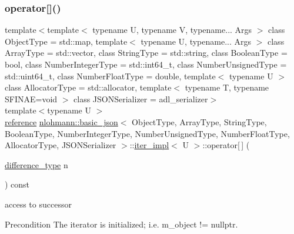 \subsubsection{\texorpdfstring{operator[]()}{operator[]()}}
{\footnotesize\ttfamily template$<$template$<$ typename U, typename V, typename... Args $>$ class Object\+Type = std\+::map, template$<$ typename U, typename... Args $>$ class Array\+Type = std\+::vector, class String\+Type  = std\+::string, class Boolean\+Type  = bool, class Number\+Integer\+Type  = std\+::int64\+\_\+t, class Number\+Unsigned\+Type  = std\+::uint64\+\_\+t, class Number\+Float\+Type  = double, template$<$ typename U $>$ class Allocator\+Type = std\+::allocator, template$<$ typename T, typename S\+F\+I\+N\+A\+E=void $>$ class J\+S\+O\+N\+Serializer = adl\+\_\+serializer$>$ \\
template$<$typename U $>$ \\
\hyperlink{classnlohmann_1_1basic__json_1_1iter__impl_ae09599e9cb4a947020a0265c0c4f3d5e}{reference} \hyperlink{classnlohmann_1_1basic__json}{nlohmann\+::basic\+\_\+json}$<$ Object\+Type, Array\+Type, String\+Type, Boolean\+Type, Number\+Integer\+Type, Number\+Unsigned\+Type, Number\+Float\+Type, Allocator\+Type, J\+S\+O\+N\+Serializer $>$\+::\hyperlink{classnlohmann_1_1basic__json_1_1iter__impl}{iter\+\_\+impl}$<$ U $>$\+::operator\mbox{[}$\,$\mbox{]} (\begin{DoxyParamCaption}\item[{\hyperlink{classnlohmann_1_1basic__json_1_1iter__impl_aa3d908ee643e5938d32e5f6d261d7715}{difference\+\_\+type}}]{n }\end{DoxyParamCaption}) const\hspace{0.3cm}{\ttfamily [inline]}}



access to successor 

\begin{DoxyPrecond}{Precondition}
The iterator is initialized; i.\+e. {\ttfamily m\+\_\+object != nullptr}. 
\end{DoxyPrecond}
\mbox{\label{classnlohmann_1_1basic__json_1_1iter__impl_a7f88e3d6564b7d7497b39460b51d2743}} 

